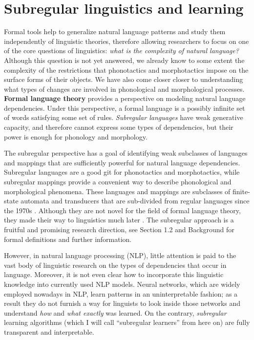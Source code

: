 \section{Subregular linguistics and learning}


Formal tools help to generalize natural language patterns and study them independently of linguistic theories, therefore allowing researchers to focus on one of the core questions of linguistics: \emph{what is the complexity of natural language?}
Although this question is not yet answered, we already know to some extent the complexity of the restrictions that phonotactics and morphotactics impose on the surface forms of their objects.
We have also come closer closer to understanding what types of changes are involved in phonological and morphological processes.
\textbf{Formal language theory} provides a perspective on modeling natural language dependencies.
Under this perspective, a formal language is a possibly infinite set of words satisfying some set of rules.
\emph{Subregular languages} have weak generative capacity, and therefore cannot express some types of dependencies, but their power is enough for phonology and morphology.


The subregular perspective has a goal of identifying weak subclasses of languages and mappings that are sufficiently powerful for natural language dependencies.
Subregular languages are a good git for phonotactics and morphotactics, while subregular mappings provide a convenient way to describe phonological and morphological phenomena.
These languages and mappings are subclasses of finite-state automata and transducers that are sub-divided from regular languages since the 1970s \citep{McNaughtonPapert1971}.
Although they are not novel for the field of formal language theory, they made their way to linguistics much later \citep{Heinz10ldp,Heinz11part1}.
The subregular approach is a fruitful and promising research direction, see Section 1.2 and Background for formal definitions and further information.


However, in natural language processing (NLP), little attention is paid to the vast body of linguistic research on the types of dependencies that occur in language.
Moreover, it is not even clear how to incorporate this linguistic knowledge into currently used NLP models.
Neural networks, which are widely employed nowadays in NLP, learn patterns in an uninterpretable fashion; as a result they do not furnish a way for linguists to look inside those networks and understand \emph{how} and \emph{what exactly} was learned.
On the contrary, \emph{subregular} learning algorithms (which I will call ``subregular learners'' from here on) are fully transparent and interpretable.


